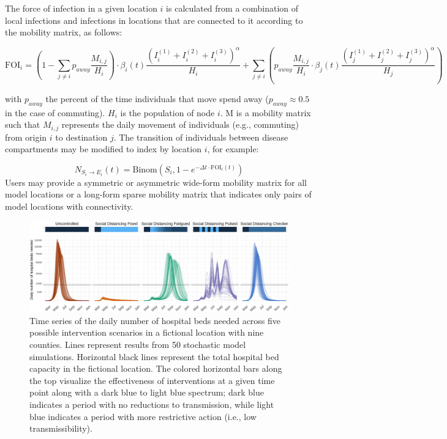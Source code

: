 {The force of infection in a given location $i$ is calculated from a combination of local infections and infections in locations that are connected to it according to the mobility matrix, as follows:
\begin{fullwidth}
\begin{equation}
\text{FOI}_i = \left(1 - \sum_{j\neq i} p_{away} \frac{M_{i,j}}{H_i} \right) \cdot \beta_i(t) \frac{\left(I_i^{(1)} + I_i^{(2)} + I_i^{(3)}\right)^\alpha}{H_i} +  \sum_{j \neq i} \left(p_{away} \frac{M_{i,j}}{H_i} \cdot \beta_j(t) \frac{\left(I_j^{(1)} + I_j^{(2)} + I_j^{(3)}\right)^\alpha}{H_j} \right)
\end{equation}
\end{fullwidth}

with $p_{away}$ the percent of the time individuals that move spend away ($p_{away} \approx 0.5$ in the case of commuting). $H_i$ is the population of node $i$. M is a mobility matrix such that $M_{i,j}$ represents the daily movement of individuals (e.g., commuting) from origin $i$ to destination $j$. The transition of individuals between disease compartments may be modified to index by location $i$, for example:

\begin{equation}
N_{S_i \to E_i} (t) = \text{Binom}\left(S_i ,1 - e^{- \Delta t \cdot\text{FOI}_{i}(t) } \right)
\end{equation}
Users may provide a symmetric or asymmetric wide-form mobility matrix for all model locations or a long-form sparse mobility matrix that indicates only pairs of model locations with connectivity.
\begin{figure}[!htb]%
    \centering
    \includegraphics{fig_pipeline/fig2a}
    \caption[Time series of the daily number of hospital beds needed across scenarios]{Time series of the daily number of hospital beds needed across five possible intervention scenarios in a fictional location with nine counties. Lines represent results from 50 stochastic model simulations. Horizontal black lines represent the total hospital bed capacity in the fictional location. The colored horizontal bars along the top visualize the effectiveness of interventions at a given time point along with a dark blue to light blue spectrum; dark blue indicates a period with no reductions to transmission, while light blue indicates a period with more restrictive action (i.e., low transmissibility).}
    \label{fig:pipeline-seir}
\end{figure}


}
